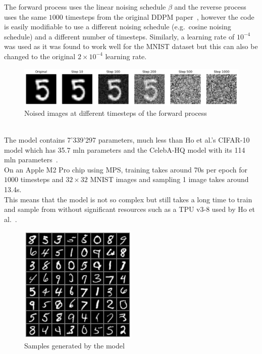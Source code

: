 \documentclass[twoside]{article}
\numberwithin{equation}{section}
\numberwithin{figure}{section}
\begin{document}
The forward process uses the linear noising schedule $\beta$ and the reverse process uses the same $1000$ timesteps from the original DDPM paper~\cite{ho2020denoising}, however the code is easily modifiable to use a different noising schedule (e.g.\ cosine noising schedule) and a different number of timesteps. Similarly, a learning rate of $10^{-4}$ was used as it was found to work well for the MNIST dataset but this can also be changed to the original $2 \times 10^{-4}$ learning rate.
\begin{figure}[h]
  \begin{center}
    \includegraphics[width=\textwidth]{images/forward.png}
    \caption{Noised images at different timesteps of the forward process}
  \end{center}
\end{figure}
\\
The model contains 7'339'297 parameters, much less than Ho et al.'s CIFAR-10 model which has 35.7 mln parameters and the CelebA-HQ model with its 114 mln parameters~\cite{ho2020denoising}. \\
On an Apple M2 Pro chip using MPS, training takes around 70s per epoch for $1000$ timesteps and $32 \times 32$ MNIST images and sampling 1 image takes around 13.4s. \\
This means that the model is not so complex but still takes a long time to train and sample from without significant resources such as a TPU v3-8 used by Ho et al.~\cite{ho2020denoising}. 
\newpage
\begin{figure}[h]
  \begin{center}
    \includegraphics[width=0.5\textwidth]{images/sample.png}
    \caption{Samples generated by the model}
  \end{center}
\end{figure}
\end{document}
